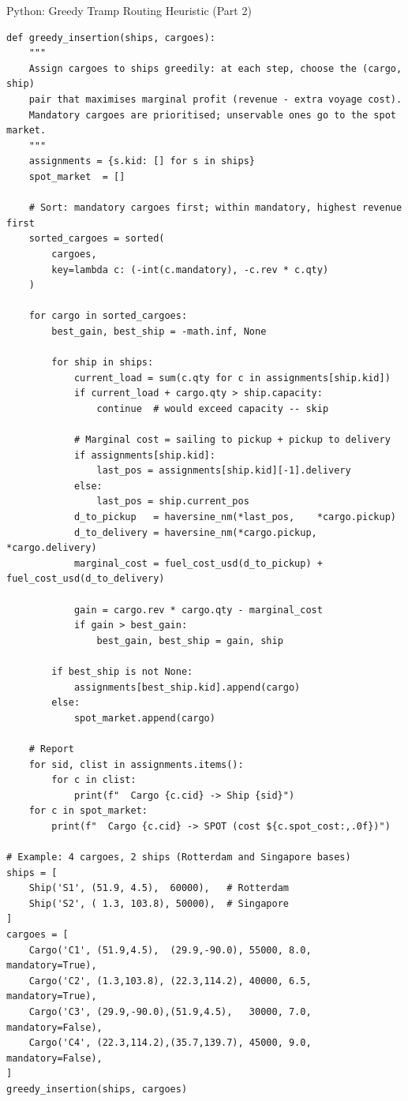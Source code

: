\documentclass[aspectratio=169,10pt]{beamer}
\begin{document}
\begin{frame}[fragile]{Python: Greedy Tramp Routing Heuristic (Part 2)}
\begin{lstlisting}[caption={Continued: greedy insertion loop and example run.}]
def greedy_insertion(ships, cargoes):
    """
    Assign cargoes to ships greedily: at each step, choose the (cargo, ship)
    pair that maximises marginal profit (revenue - extra voyage cost).
    Mandatory cargoes are prioritised; unservable ones go to the spot market.
    """
    assignments = {s.kid: [] for s in ships}
    spot_market  = []

    # Sort: mandatory cargoes first; within mandatory, highest revenue first
    sorted_cargoes = sorted(
        cargoes,
        key=lambda c: (-int(c.mandatory), -c.rev * c.qty)
    )

    for cargo in sorted_cargoes:
        best_gain, best_ship = -math.inf, None

        for ship in ships:
            current_load = sum(c.qty for c in assignments[ship.kid])
            if current_load + cargo.qty > ship.capacity:
                continue  # would exceed capacity -- skip

            # Marginal cost = sailing to pickup + pickup to delivery
            if assignments[ship.kid]:
                last_pos = assignments[ship.kid][-1].delivery
            else:
                last_pos = ship.current_pos
            d_to_pickup   = haversine_nm(*last_pos,    *cargo.pickup)
            d_to_delivery = haversine_nm(*cargo.pickup, *cargo.delivery)
            marginal_cost = fuel_cost_usd(d_to_pickup) + fuel_cost_usd(d_to_delivery)

            gain = cargo.rev * cargo.qty - marginal_cost
            if gain > best_gain:
                best_gain, best_ship = gain, ship

        if best_ship is not None:
            assignments[best_ship.kid].append(cargo)
        else:
            spot_market.append(cargo)

    # Report
    for sid, clist in assignments.items():
        for c in clist:
            print(f"  Cargo {c.cid} -> Ship {sid}")
    for c in spot_market:
        print(f"  Cargo {c.cid} -> SPOT (cost ${c.spot_cost:,.0f})")

# Example: 4 cargoes, 2 ships (Rotterdam and Singapore bases)
ships = [
    Ship('S1', (51.9, 4.5),  60000),   # Rotterdam
    Ship('S2', ( 1.3, 103.8), 50000),  # Singapore
]
cargoes = [
    Cargo('C1', (51.9,4.5),  (29.9,-90.0), 55000, 8.0, mandatory=True),
    Cargo('C2', (1.3,103.8), (22.3,114.2), 40000, 6.5, mandatory=True),
    Cargo('C3', (29.9,-90.0),(51.9,4.5),   30000, 7.0, mandatory=False),
    Cargo('C4', (22.3,114.2),(35.7,139.7), 45000, 9.0, mandatory=False),
]
greedy_insertion(ships, cargoes)
\end{lstlisting}
\end{frame}
\end{document}
